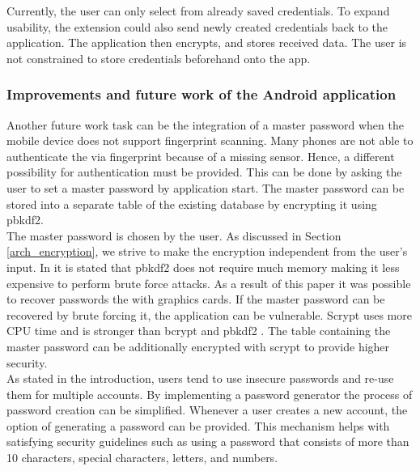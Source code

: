 Currently, the user can only select from already saved credentials. To expand usability, the extension could also send newly created credentials back to the application. The application then encrypts, and stores received data. The user is not constrained to store credentials beforehand onto the app. 

\subsubsection*{Improvements and future work of the Android application}
Another future work task can be the integration of a master password when the mobile device does not support fingerprint scanning. Many phones are not able to authenticate the via fingerprint because of a missing sensor. Hence, a different possibility for authentication must be provided. This can be done by asking the user to set a master password by application start. The master password can be stored into a separate table of the existing database by encrypting it using \gls{pbkdf2}. \\
The master password is chosen by the user. As discussed in Section \ref{arch_encryption}, we strive to make the encryption independent from the user's input. In \cite{percival2009stronger} it is stated that \gls{pbkdf2} does not require much memory making it less expensive to perform brute force attacks. As a result of this paper \cite{DBLP:conf/esorics/DurmuthGKPYZ12} it was possible to recover passwords the with graphics cards. If the master password can be recovered by brute forcing it, the application can be vulnerable. Scrypt uses more CPU time and is stronger than bcrypt and \gls{pbkdf2} \cite{percival2009stronger}. The table containing the master password can be additionally encrypted with scrypt to provide higher security. \\

As stated in the introduction, users tend to use insecure passwords and re-use them for multiple accounts. By implementing a password generator the process of password creation can be simplified. Whenever a user creates a new account, the option of generating a password can be provided. This mechanism helps with satisfying security guidelines such as using a password that consists of more than 10 characters, special characters, letters, and numbers.

